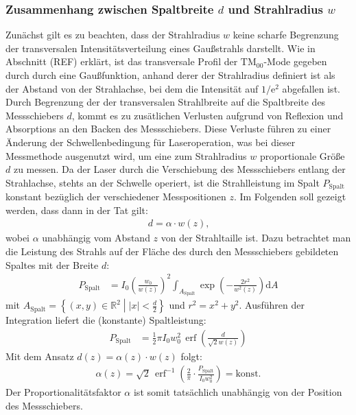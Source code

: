 \documentclass[11pt, a4paper]{article}
\numberwithin{equation}{section}
\DeclareMathOperator{\erf}{erf}
\begin{document}
\subsubsection{Zusammenhang zwischen Spaltbreite $d$ und Strahlradius $w$}
\label{sssec:spaltbreite_strahlradius}
Zunächst gilt es zu beachten, dass der Strahlradius $w$ keine scharfe Begrenzung der transversalen Intensitätsverteilung eines Gaußstrahls darstellt.
Wie in Abschnitt (REF) erklärt, ist das transversale Profil der $\mathrm{TM}_{00}$-Mode gegeben durch durch eine Gaußfunktion, anhand derer der Strahlradius definiert ist als der Abstand von der Strahlachse, bei dem die Intensität auf $1/\mathrm{e}^2$ abgefallen ist.
Durch Begrenzung der der transversalen Strahlbreite auf die Spaltbreite des Messschiebers $d$, kommt es zu zusätlichen Verlusten aufgrund von Reflexion und Absorptions an den Backen des Messschiebers.
Diese Verluste führen zu einer Änderung der Schwellenbedingung für Laseroperation, was bei dieser Messmethode ausgenutzt wird, um eine zum Strahlradius $w$ proportionale Größe $d$ zu messen.
Da der Laser durch die Verschiebung des Messschiebers entlang der Strahlachse, stehts an der Schwelle operiert, ist die Strahlleistung im Spalt $P_\mathrm{Spalt}$ konstant bezüglich der verschiedener Messpositionen $z$.
Im Folgenden soll gezeigt werden, dass dann in der Tat gilt:
\begin{align}
	d = \alpha \cdot w(z) \text{,}
\end{align}
wobei $\alpha$ unabhängig vom Abstand $z$ von der Strahltaille ist.
Dazu betrachtet man die Leistung des Strahls auf der Fläche des durch den Messschiebers gebildeten Spaltes mit der Breite $d$:
\begin{align}
	P_\mathrm{Spalt} &= I_0 \left( \frac{w_0}{w(z)} \right)^2 \int_{A_\mathrm{Spalt}} \exp\left( -\frac{2 r^2}{w^2(z)} \right) \mathrm{d}A
\end{align}
mit $A_\mathrm{Spalt} = \left\{(x,y) \in \mathbb{R}^2 \middle| |x| < \frac{d}{2} \right\}$ und $r^2 = x^2 + y^2$.
Ausführen der Integration liefert die (konstante) Spaltleistung:
\begin{align}
	P_\mathrm{Spalt} &= \frac{1}{2} \pi I_0 w_0^2 \,\erf\left( \frac{d}{\sqrt{2} w(z)} \right)
\end{align}
Mit dem Ansatz $d(z) = \alpha(z) \cdot w(z)$ folgt:
\begin{align}
	\alpha(z) = \sqrt{2} \, \erf^{-1}\left( \frac{2}{\pi} \cdot \frac{P_\mathrm{Spalt}}{I_0 w_0^2}\right) = \mathrm{konst.}
\end{align}
Der Proportionalitätsfaktor $\alpha$ ist somit tatsächlich unabhängig von der Position des Messschiebers.
\end{document}
